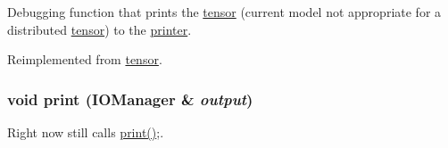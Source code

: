 Debugging function that prints the \hyperlink{classJKBuilder_1_1tensor}{tensor} (current model not appropriate for a distributed \hyperlink{classJKBuilder_1_1tensor}{tensor}) to the \hyperlink{classJKBuilder_1_1printer}{printer}. 

Reimplemented from \hyperlink{classJKBuilder_1_1tensor_a388f572c62279f839ee138a9afbdeeb5}{tensor}.\hypertarget{classJKBuilder_1_1DistributedMatrix_a74b2fe351a5444c1325870dc6162f451}{
\subsubsection[{print}]{\setlength{\rightskip}{0pt plus 5cm}void print ({\bf IOManager} \& {\em output})}}
\label{classJKBuilder_1_1DistributedMatrix_a74b2fe351a5444c1325870dc6162f451}


Right now still calls \hyperlink{classJKBuilder_1_1DistributedMatrix_a388f572c62279f839ee138a9afbdeeb5}{print()};. 

